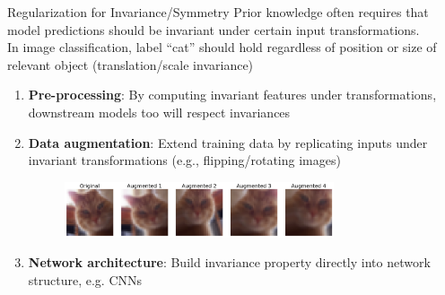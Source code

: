 \documentclass[11pt,compress,t,notes=noshow, xcolor=table]{beamer}
\begin{document}
\begin{vbframe}{Regularization for Invariance/Symmetry}
Prior knowledge often requires that model predictions should be invariant under certain input transformations.\\
In image classification, label ``cat'' should hold regardless of position or size of relevant object (translation/scale invariance)
\begin{enumerate}\setlength\itemsep{1.02em}
    \item \textbf{Pre-processing}: By computing invariant features under transformations, downstream models too will respect invariances
    \item \textbf{Data augmentation}: Extend training data by replicating inputs under invariant transformations (e.g., flipping/rotating images)
    \begin{figure}
    \includegraphics[width=0.75\textwidth]{figure_man/data-augmentation-cat.png}\\
    \end{figure}
    \item \textbf{Network architecture}: Build invariance property directly into network structure, e.g. CNNs 
\end{enumerate}


\end{vbframe}
\end{document}
